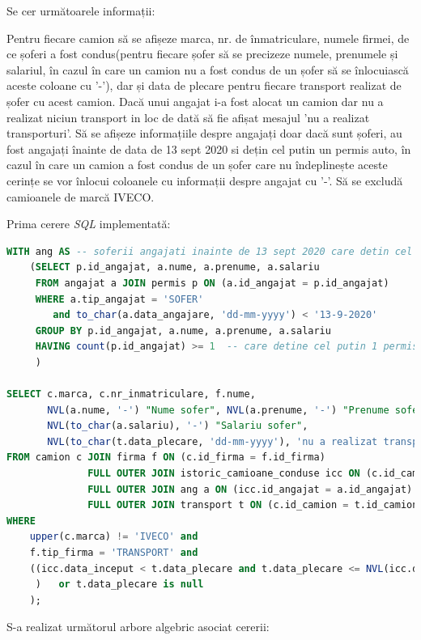 \documentclass[12pt, a4paper]{article}
\begin{document}
Se cer următoarele informații:

Pentru fiecare camion să se afișeze marca, nr. de înmatriculare, numele firmei, de ce șoferi a fost condus(pentru fiecare șofer să se precizeze numele, prenumele și salariul, în cazul în care un camion nu a fost condus de un șofer să se înlocuiască aceste coloane cu '-'), dar și data de plecare pentru fiecare transport realizat de șofer cu acest camion. Dacă unui angajat i-a fost alocat un camion dar nu a realizat niciun transport in loc de dată să fie afișat mesajul 'nu a realizat transporturi'. Să se afișeze informațiile despre angajați doar dacă sunt șoferi, au fost angajați înainte de data de 13 sept 2020 si dețin cel putin un permis auto, în cazul în care un camion a fost condus de un șofer care nu îndeplinește aceste cerințe se vor înlocui coloanele cu informații despre angajat cu '-'. Să se excludă camioanele de marcă IVECO.

Prima cerere \emph{SQL} implementată:

\begin{lstlisting}[language=SQL]
WITH ang AS -- soferii angajati inainte de 13 sept 2020 care detin cel mult 2 permise auto
    (SELECT p.id_angajat, a.nume, a.prenume, a.salariu
     FROM angajat a JOIN permis p ON (a.id_angajat = p.id_angajat)
     WHERE a.tip_angajat = 'SOFER'
        and to_char(a.data_angajare, 'dd-mm-yyyy') < '13-9-2020' 
     GROUP BY p.id_angajat, a.nume, a.prenume, a.salariu
     HAVING count(p.id_angajat) >= 1  -- care detine cel putin 1 permis  
     )

SELECT c.marca, c.nr_inmatriculare, f.nume, 
       NVL(a.nume, '-') "Nume sofer", NVL(a.prenume, '-') "Prenume sofer", 
       NVL(to_char(a.salariu), '-') "Salariu sofer",
       NVL(to_char(t.data_plecare, 'dd-mm-yyyy'), 'nu a realizat transporturi') "Data transport"
FROM camion c JOIN firma f ON (c.id_firma = f.id_firma)
              FULL OUTER JOIN istoric_camioane_conduse icc ON (c.id_camion = icc.id_camion)
              FULL OUTER JOIN ang a ON (icc.id_angajat = a.id_angajat)
              FULL OUTER JOIN transport t ON (c.id_camion = t.id_camion)
WHERE
    upper(c.marca) != 'IVECO' and
    f.tip_firma = 'TRANSPORT' and 
    ((icc.data_inceput < t.data_plecare and t.data_plecare <= NVL(icc.data_sfarsit, sysdate)
     )   or t.data_plecare is null
    );
\end{lstlisting}

\newpage
S-a realizat următorul arbore algebric asociat cererii:
\end{document}
